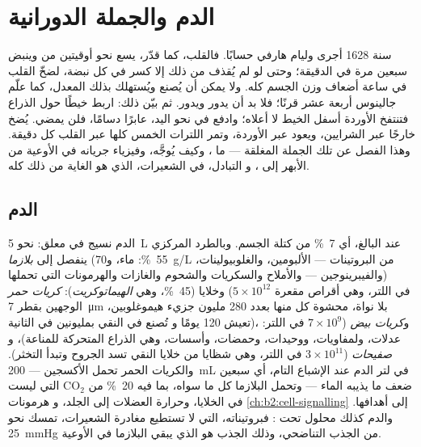 \chapter{الدم والجملة الدورانية}\label{ch:b2:blood-circulation}

سنة 1628 أجرى وليام هارفي حسابًا. فالقلب، كما قدّر، يسع
نحو أوقيتين من  وينبض سبعين مرة في الدقيقة؛ وحتى لو
لم يُقذف من ذلك إلا كسر في كل نبضة، لضخّ القلب
في ساعة أضعاف وزن الجسم كله. ولا يمكن أن
يُصنع  ويُستهلك بذلك المعدل، كما علّم جالينوس
أربعة عشر قرنًا؛ فلا بد أن يدور ويدور. ثم
بيّن ذلك: اربط خيطًا حول الذراع فتنتفخ الأوردة أسفل
الخيط لا أعلاه؛ وادفع  في  نحو اليد، عابرًا
دسامًا، فلن يمضي.  يُضخ خارجًا عبر
الشرايين، ويعود عبر الأوردة، وتمر اللترات الخمس كلها
عبر القلب كل دقيقة. وهذا الفصل عن تلك الجملة المغلقة
--- ما ، وكيف يُوجَّه، وفيزياء جريانه
في الأوعية من الأبهر إلى ، و
التبادل، في الشعيرات، الذي هو الغاية من ذلك كله.

\section{الدم}

\begin{definition}\label{def:b2:blood-circulation:blood}
الدم نسيج في معلق: نحو \qty{5}{L} عند البالغ، أي
\qty{7}{\%} من كتلة الجسم. وبالطرد المركزي ينفصل إلى
\emph{بلازما} (\qty{55}{\%}: ماء، و\qty{70}{g/L} من البروتينات ---
الألبومين، والغلوبيولينات، والفيبرينوجين --- والأملاح والسكريات والشحوم
والغازات والهرمونات التي تحملها) وخلايا (\qty{45}{\%}، وهي
\emph{الهيماتوكريت}): \emph{كريات حمر} ($5\times 10^{12}$ في اللتر،
وهي أقراص مقعرة الوجهين بقطر \qty{7}{\micro m} بلا نواة، محشوة كل منها
بعدد \num{280} مليون جزيء هيموغلوبين، تعيش 120 يومًا و
تُصنع في النقي بمليونين في الثانية)، و\emph{كريات بيض}
($7\times 10^{9}$ في اللتر: عدلات، ولمفاويات، ووحيدات،
وحمضات، وأسسات، وهي الذراع المتحركة للمناعة)، و
\emph{صفيحات} ($3\times 10^{11}$ في اللتر، وهي شظايا من خلايا
النقي تسد الجروح وتبدأ التخثر). والكريات الحمر تحمل
الأكسجين --- \qty{200}{mL} في لتر الدم عند الإشباع التام،
أي سبعين ضعف ما يذيبه الماء --- وتحمل البلازما
كل ما سواه، بما فيه \qty{20}{\%} من $\mathrm{CO_2}$ التي
ليست في الخلايا، وحرارة العضلات إلى الجلد، و
هرمونات \cref{ch:b2:cell-signalling} إلى أهدافها. والدم
كذلك محلول تحت \emph{}: فبروتيناته،
التي لا تستطيع مغادرة الشعيرات، تمسك نحو \qty{25}{mmHg} من
الجذب التناضحي، وذلك الجذب هو الذي يبقي البلازما في
الأوعية.
\end{definition}

